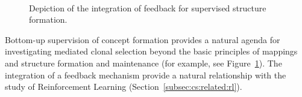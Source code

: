 \begin{figure}[htp]
	\hfill
	\\
	\caption{Depiction of the integration of feedback for supervised structure formation.}
	\label{fig:cells:mediated:supervised} %
\end{figure}

Bottom-up supervision of concept formation provides a natural agenda for investigating mediated clonal selection beyond the basic principles of mappings and structure formation and maintenance (for example, see Figure~\ref{fig:cells:mediated:supervised}). The integration of a feedback mechanism provide a natural relationship with the study of Reinforcement Learning (Section~\ref{subsec:cs:related:rl}).

